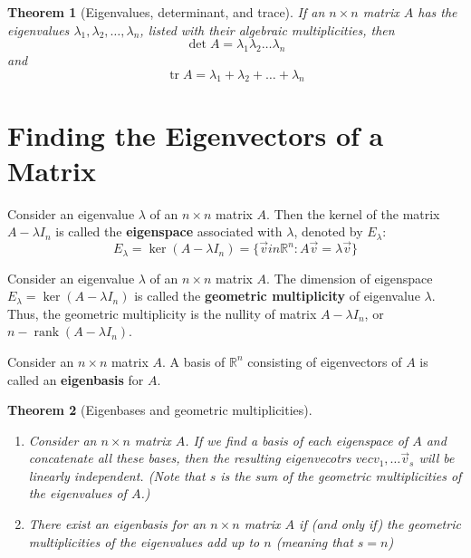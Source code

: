 \documentclass[letter]{article}
\newcommand{\R}{\mathbb{R}}
\newcommand{\rank}{\operatorname{rank}}
\newcommand{\tr}{\operatorname{tr}}
\newtheorem{theorem}{Theorem}[section]
\newenvironment{definition}[1][Definition]{\begin{trivlist}
\item[\hskip \labelsep {\bfseries #1}]}{\end{trivlist}}
\begin{document}
\begin{theorem}[Eigenvalues, determinant, and trace]
If an $n\times n$ matrix $A$ has the eigenvalues $\lambda_1, \lambda_2, \ldots, \lambda_n$, listed with their algebraic multiplicities, then
\[
\det A = \lambda_1\lambda_2\ldots\lambda_n
\]
and
\[
\tr A = \lambda_1 + \lambda_2 + \ldots + \lambda_n
\]
\end{theorem}
\section{Finding the Eigenvectors of a Matrix}
\begin{definition}
Consider an eigenvalue $\lambda$ of an $n\times n$ matrix $A$. Then the kernel of the matrix $A - \lambda I_n$ is called the \textbf{eigenspace} associated with $\lambda$, denoted by $E_\lambda$:
\[
E_\lambda = \ker(A - \lambda I_n) = \{\vec v in \R^n : A\vec v = \lambda \vec v\}
\]
\end{definition}

\begin{definition}
Consider an eigenvalue $\lambda$ of an $n \times n$ matrix $A$. The dimension of eigenspace $E_ \lambda = \ker(A - \lambda I_n)$ is called the \textbf{geometric multiplicity} of eigenvalue $\lambda$. Thus, the geometric multiplicity is the nullity of matrix $A - \lambda I_n$, or $n-\rank(A - \lambda I_n)$.
\end{definition}

\begin{definition}
Consider an $n\times n$ matrix $A$. A basis of $\R^n$ consisting of eigenvectors of $A$ is called an \textbf{eigenbasis} for $A$.
\end{definition}

\begin{theorem}[Eigenbases and geometric multiplicities]
\begin{enumerate}
\item Consider an $n\times n$ matrix $A$. If we find a basis of each eigenspace of $A$ and concatenate all these bases, then the resulting eigenvecotrs $vec v_1, \ldots \vec v_s$ will be linearly independent. (Note that $s$ is the sum of the geometric multiplicities of the eigenvalues of $A$.)
\item There exist an eigenbasis for an $n\times n$ matrix $A$ if (and only if) the geometric multiplicities of the eigenvalues add up to $n$ (meaning that $s = n$)
\end{enumerate}
\end{theorem}
\end{document}
